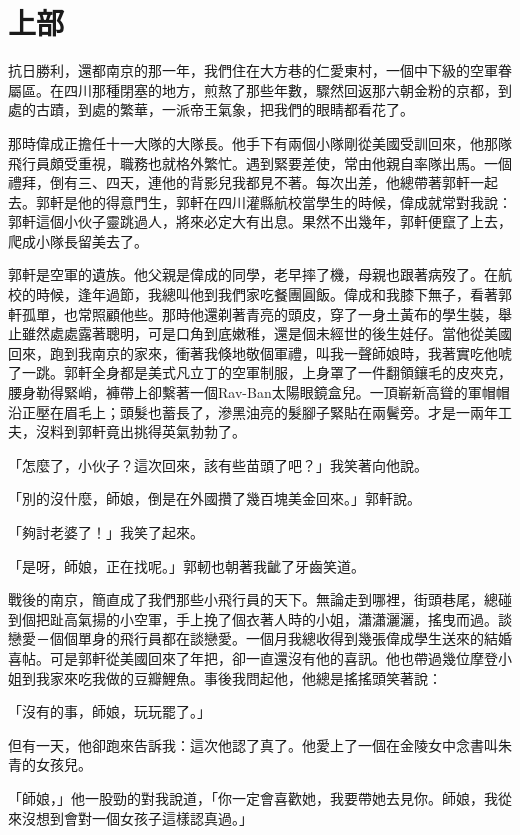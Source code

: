 \section{上部}

\sloppy

抗日勝利，還都南京的那一年，我們住在大方巷的仁愛東村，一個中下級的空軍眷屬區。在四川那種閉塞的地方，煎熬了那些年數，驟然回返那六朝金粉的京都，到處的古蹟，到處的繁華，一派帝王氣象，把我們的眼睛都看花了。

那時偉成正擔任十一大隊的大隊長。他手下有兩個小隊剛從美國受訓回來，他那隊飛行員頗受重視，職務也就格外繁忙。遇到緊要差使，常由他親自率隊出馬。一個禮拜，倒有三、四天，連他的背影兒我都見不著。每次出差，他總帶著郭軒一起去。郭軒是他的得意門生，郭軒在四川灌縣航校當學生的時候，偉成就常對我說：郭軒這個小伙子靈跳過人，將來必定大有出息。果然不出幾年，郭軒便竄了上去，爬成小隊長留美去了。

郭軒是空軍的遺族。他父親是偉成的同學，老早摔了機，母親也跟著病歿了。在航校的時候，逢年過節，我總叫他到我們家吃餐團圓飯。偉成和我膝下無子，看著郭軒孤單，也常照顧他些。那時他還剃著青亮的頭皮，穿了一身土黃布的學生裝，舉止雖然處處露著聰明，可是口角到底嫩稚，還是個未經世的後生娃仔。當他從美國回來，跑到我南京的家來，衝著我倏地敬個軍禮，叫我一聲師娘時，我著實吃他唬了一跳。郭軒全身都是美式凡立丁的空軍制服，上身罩了一件翻領鑲毛的皮夾克，腰身勒得緊峭，褲帶上卻繫著一個Rav-Ban太陽眼鏡盒兒。一頂嶄新高聳的軍帽帽沿正壓在眉毛上；頭髮也蓄長了，滲黑油亮的髮腳子緊貼在兩鬢旁。才是一兩年工夫，沒料到郭軒竟出挑得英氣勃勃了。

「怎麼了，小伙子？這次回來，該有些苗頭了吧？」我笑著向他說。

「別的沒什麼，師娘，倒是在外國攢了幾百塊美金回來。」郭軒說。

「夠討老婆了！」我笑了起來。

「是呀，師娘，正在找呢。」郭軔也朝著我齜了牙齒笑道。

戰後的南京，簡直成了我們那些小飛行員的天下。無論走到哪裡，街頭巷尾，總碰到個把趾高氣揚的小空軍，手上挽了個衣著人時的小姐，瀟瀟灑灑，搖曳而過。談戀愛－個個單身的飛行員都在談戀愛。一個月我總收得到幾張偉成學生送來的結婚喜帖。可是郭軒從美國回來了年把，卻一直還沒有他的喜訊。他也帶過幾位摩登小姐到我家來吃我做的豆瓣鯉魚。事後我問起他，他總是搖搖頭笑著說：

「沒有的事，師娘，玩玩罷了。」


但有一天，他卻跑來告訴我：這次他認了真了。他愛上了一個在金陵女中念書叫朱青的女孩兒。

「師娘，」他一股勁的對我說道，「你一定會喜歡她，我要帶她去見你。師娘，我從來沒想到會對一個女孩子這樣認真過。」

